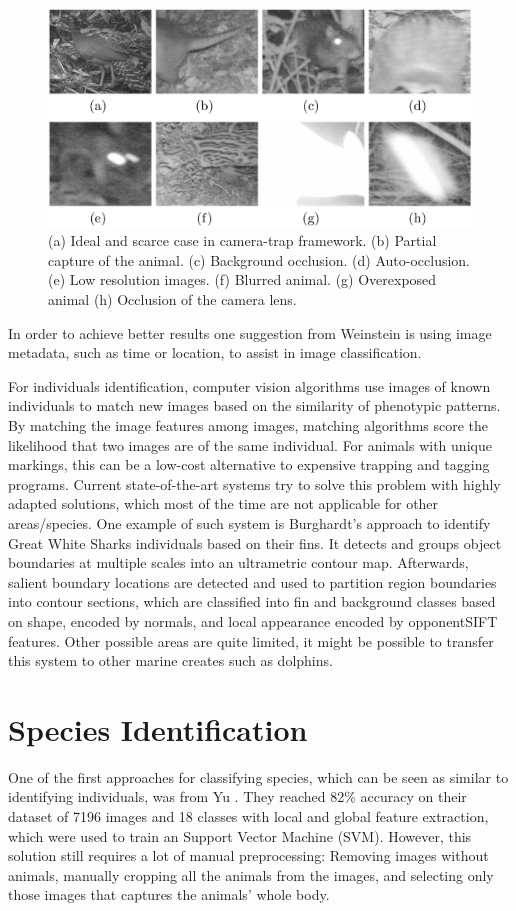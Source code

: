 \documentclass[electronic]{vgtc}             %
\begin{document}
	\begin{figure}[htbp]
		\includegraphics[width=.48\textwidth]{quality}
		\caption{(a) Ideal and scarce case in camera-trap framework. (b) Partial capture of
			the animal. (c) Background occlusion. (d) Auto-occlusion. (e) Low resolution images.
			(f) Blurred animal. (g) Overexposed animal (h) Occlusion of the camera lens.\cite{Gomez:2016:Low}}
		\label{fig:quality}
	\end{figure}

	In order to achieve better results one suggestion from Weinstein \cite{Weinstein:2017} is using image metadata, such as time or location, to assist in image	classification.
	
	For individuals identification, computer vision algorithms use images of known individuals to match new images based on the similarity of phenotypic patterns. 
	By matching the image features	among images, matching algorithms score the likelihood that two images are of the same individual. 
	For animals with unique markings, this	can be a low-­cost alternative to expensive trapping and tagging programs.
	Current state-of-the-art systems try to solve this problem with highly adapted solutions, which most of the time are not applicable for other areas/species. One example of such system is Burghardt's \cite{Burghardt:2016} approach to identify Great White Sharks individuals based on their fins. 
	It detects and groups object boundaries at multiple scales into an	ultrametric contour map. Afterwards, salient boundary locations are	detected and used to partition region boundaries into contour	sections, which  are classified into fin and	background classes based on shape, encoded by normals, and	local appearance encoded by opponentSIFT features. 
	Other possible areas are quite limited, it might be possible to transfer this system to other marine creates such as dolphins. 
	
	\section{Species Identification}
	
	One of the first approaches for classifying species, which can be seen as similar to identifying individuals, was from Yu \cite{Yu:2013}.
	They reached 82\% accuracy on their dataset of 7196 images and 18 classes with local and global feature extraction, which were used to train an Support Vector Machine (SVM).
	However, this solution still requires a lot of manual preprocessing:
	Removing images without animals, manually cropping all the animals from the images, and selecting only those images that captures the animals’ whole body.
	
\end{document}
